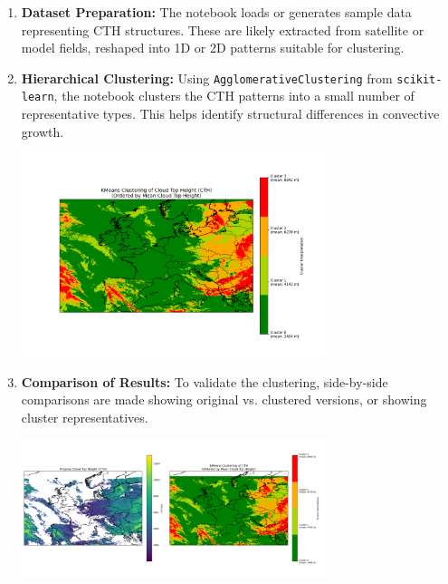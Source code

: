 \begin{enumerate}[label=\textbf{Step \arabic*:}, leftmargin=2cm]

\item \textbf{Dataset Preparation:} The notebook loads or generates sample data representing CTH structures. These are likely extracted from satellite or model fields, reshaped into 1D or 2D patterns suitable for clustering.

\item \textbf{Hierarchical Clustering:} Using \texttt{AgglomerativeClustering} from \texttt{scikit-learn}, the notebook clusters the CTH patterns into a small number of representative types. This helps identify structural differences in convective growth.

\begin{center}
    \includegraphics[width=0.7\textwidth]{images/cth_clusters_ordered.png}
\end{center}

\item \textbf{Comparison of Results:} To validate the clustering, side-by-side comparisons are made showing original vs. clustered versions, or showing cluster representatives.

\begin{center}
    \includegraphics[width=0.7\textwidth]{images/cth_comparison_side_by_side.png}
\end{center}


\end{enumerate}
